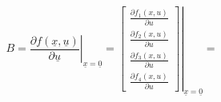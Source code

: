\begin{equation} \label{jB}
    B=  \left. \frac{\partial f(\underline{x},\underline{u})}{\partial \underline{u}} \right|_{\underline{x}=\underline{0}} =
    \left. \begin{bmatrix}
    \frac{\partial f_1(x,u)}{\partial u} \\
    \frac{\partial f_2(x,u)}{\partial u} \\
    \frac{\partial f_3(x,u)}{\partial u} \\
    \frac{\partial f_4(x,u)}{\partial u}
    \end{bmatrix} \right|_{\underline{x}=\underline{0}}
    = 
\end{equation}
